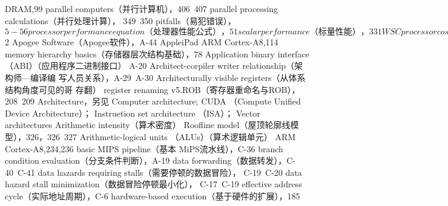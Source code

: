 DRAM,99
parallel computers（并行计算机），406~407
parallel processing calculations（并行处理计算），
349~350
pitfalls（易犯错误），$5-56
processor performance equation（处理器性能公式），
51
scalar performance（标量性能），331
WSC processor cost-performance（WSC 处理器成本性
能），472~473
AMD Barcelona microprocessor （AMD Barcelona 微处理
器），467
AMID Opteron
address translation（地址变换），B-38
Amazon Web Services （Amazot Web 服务），457
architecture（体系结构），15
cache coherence（缓存一致性），361
data cache example（数据缓存示例），B-12~B-15,B-13
Google WSC servers（Google WSC服务器），468~-469
inclusion（包含性），398
manufacturing cost（制造成本），62
misses per instruction（每条指令的缺失数），B-15
MOESI protocol （MOESI 协议），362
multicore processor performance（多核处理器性能），
400-401
multilevel exclusion（多级互斥），B-35
paged virtual memory example（分页虚拟存储器示例），
B-54~B-57
Pentium protection（Pentium保护），B-57
real-world server considerations（现实服务器考忠事
项），52~55
server energy savings（服务器节館），25
snooping limitations（监听局限性），363~364
SPEC benchmarks（SPEC基准测试），43
TLB during address translation（地址变换期间的TLB），
B~47
AMD processors（AMD处理器）
architecture flaws vs. success（体系结构缺陷与成功），
A-45
shared-mnemory multiprogramming workload（共享存储
器多重编程工作负载），378
teroninology（术语），313~315
tournament predictors（竞赛预测器），164
Virtual Machines（虚拟机），110
VMIMs,129
Android OS,324
Antialiasing, address translation（别名消去，地址变换），
B-38
Antidependences（反相关），1$2
Apogee Software（Apogee软件），A-44
AppleiPad
ARM Cortex-A8,114
memory hierarchy basics（存储器层次结构基础），78
Application binary interface （ABI）（应用程序二进制接口）
A-20
Architect-corpiler writer relationship（架构师—编译编
写人员关系），A-29~A-30
Architecturally visible registers（从体系结构角度可见的哥
存翻）
register renaming v5.ROB（寄存器重命名与ROB），
208~209
Architecture，另见 Computer architecture; CUDA （Compute
Unified Device Arcbitecture）； Instruetion set architecture
（ISA）； Vector architectures
Arithmetic intensity（算术密度）
Roofline model（屋顶轮廓线模型），326，326~327
Arithmetic-logical units （ALUs）（算术逻辑单元）
ARM Cortex-A8,234,236
basic MIPS pipeline（基本 MiPS流水线），C-36
branch condition evaluation（分支条件判断），A-19
data forwarding（数据转发），C-40~C-41
data hazards requiring stalls（需要停顿的数据冒险），
C-19~C-20
data hazard stall minimization（数据冒险停顿最小化），
C-17~C-19
effective address cycle（实际地址周期），C-6
hardware-based execution（基于硬件的扩展），185
